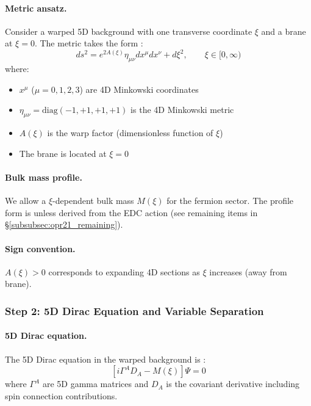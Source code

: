 \paragraph{Metric ansatz.}
Consider a warped 5D background with one transverse coordinate $\xi$ and a brane
at $\xi = 0$. The metric takes the form \tagP{}:
\begin{equation}
    \boxed{
    ds^2 = e^{2A(\xi)}\eta_{\mu\nu}dx^\mu dx^\nu + d\xi^2, \qquad \xi \in [0, \infty)
    }
    \label{eq:opr21:metric}
\end{equation}
where:
\begin{itemize}[nosep]
    \item $x^\mu$ ($\mu = 0,1,2,3$) are 4D Minkowski coordinates
    \item $\eta_{\mu\nu} = \text{diag}(-1, +1, +1, +1)$ is the 4D Minkowski metric
    \item $A(\xi)$ is the warp factor (dimensionless function of $\xi$)
    \item The brane is located at $\xi = 0$
\end{itemize}

\paragraph{Bulk mass profile.}
We allow a $\xi$-dependent bulk mass $M(\xi)$ for the fermion sector. The profile
form is \tagP{} unless derived from the EDC action (see remaining items in
\S\ref{subsubsec:opr21_remaining}).

\paragraph{Sign convention.}
$A(\xi) > 0$ corresponds to expanding 4D sections as $\xi$ increases (away from brane).

\subsubsection{Step 2: 5D Dirac Equation and Variable Separation}
\label{subsubsec:opr21_step2}

\paragraph{5D Dirac equation.}
The 5D Dirac equation in the warped background is \tagDc{}:
\begin{equation}
    \left[i\Gamma^A D_A - M(\xi)\right] \Psi = 0
    \label{eq:opr21:5ddirac}
\end{equation}
where $\Gamma^A$ are 5D gamma matrices and $D_A$ is the covariant derivative
including spin connection contributions.

